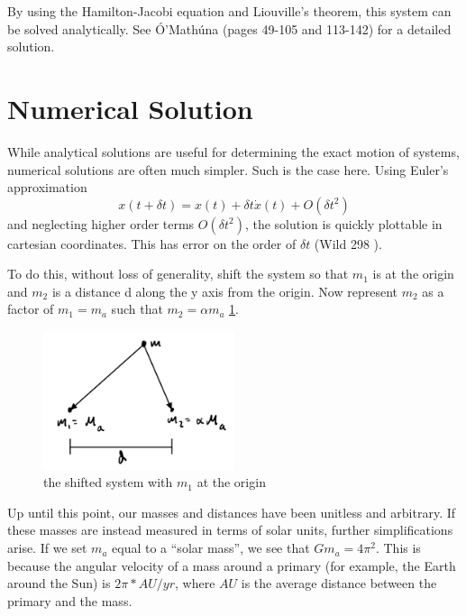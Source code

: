 \documentclass[preprint,titlepage,preprintnumbers,amsmath,amssymb,aps,11pt]{revtex4-2}
\begin{document}
By using the Hamilton-Jacobi equation and Liouville's theorem, this system can be solved analytically. See Ó'Mathúna \cite{OMathuna2008} (pages 49-105 and 113-142) for a detailed solution.

\section{Numerical Solution}
While analytical solutions are useful for determining the exact motion of systems, numerical solutions are often much simpler. Such is the case here. Using Euler's approximation
\begin{equation}
    x(t+\delta t)=x(t)+\delta t\dot{x}(t)+O(\delta t^2)
    \label{eq:eulersmethod}
\end{equation}
and neglecting higher order terms $O(\delta t^2)$, the solution is quickly plottable in cartesian coordinates. This has error on the order of $\delta t$ (Wild 298 \cite{Wild1980}).

To do this, without loss of generality, shift the system so that $m_1$ is at the origin and $m_2$ is a distance d along the y axis from the origin. Now represent $m_2$ as a factor of $m_1=m_a$ such that $m_2=\alpha m_a$ \ref{fig:shiftedsys}.
\begin{figure}
    \centering
    \includegraphics[width=0.5\textwidth]{Fig 3.jpeg}
    \caption{the shifted system with $m_1$ at the origin}
    \label{fig:shiftedsys}
\end{figure}

Up until this point, our masses and distances have been unitless and arbitrary. If these masses are instead measured in terms of solar units, further simplifications arise. If we set $m_a$ equal to a “solar mass”, we see that $Gm_a=4\pi^2$. This is because the angular velocity of a mass around a primary (for example, the Earth around the Sun) is $2\pi*AU/yr$, where $AU$ is the average distance between the primary and the mass.
\end{document}
